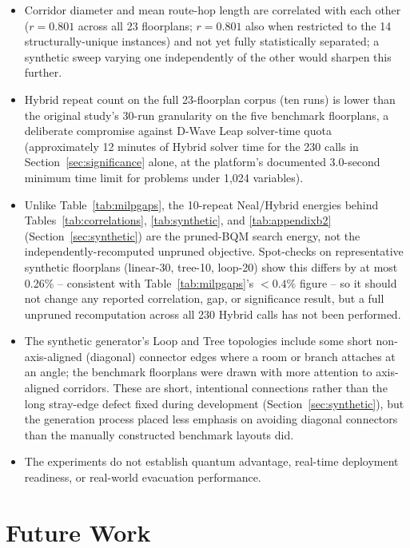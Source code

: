 \documentclass[11pt]{article}
\begin{document}
\begin{itemize}[leftmargin=*]
\item Corridor diameter and mean route-hop length are correlated with each other ($r=0.801$ across all 23 floorplans; $r=0.801$ also when restricted to the 14 structurally-unique instances) and not yet fully statistically separated; a synthetic sweep varying one independently of the other would sharpen this further.
\item Hybrid repeat count on the full 23-floorplan corpus (ten runs) is lower than the original study's 30-run granularity on the five benchmark floorplans, a deliberate compromise against D-Wave Leap solver-time quota (approximately 12 minutes of Hybrid solver time for the 230 calls in Section~\ref{sec:significance} alone, at the platform's documented 3.0-second minimum time limit for problems under 1,024 variables).
\item Unlike Table~\ref{tab:milpgaps}, the 10-repeat Neal/Hybrid energies behind Tables~\ref{tab:correlations}, \ref{tab:synthetic}, and \ref{tab:appendixb2} (Section~\ref{sec:synthetic}) are the pruned-BQM search energy, not the independently-recomputed unpruned objective. Spot-checks on representative synthetic floorplans (linear-30, tree-10, loop-20) show this differs by at most 0.26\% -- consistent with Table~\ref{tab:milpgaps}'s $<0.4\%$ figure -- so it should not change any reported correlation, gap, or significance result, but a full unpruned recomputation across all 230 Hybrid calls has not been performed.
\item The synthetic generator's Loop and Tree topologies include some short non-axis-aligned (diagonal) connector edges where a room or branch attaches at an angle; the benchmark floorplans were drawn with more attention to axis-aligned corridors. These are short, intentional connections rather than the long stray-edge defect fixed during development (Section~\ref{sec:synthetic}), but the generation process placed less emphasis on avoiding diagonal connectors than the manually constructed benchmark layouts did.
\item The experiments do not establish quantum advantage, real-time deployment readiness, or real-world evacuation performance.
\end{itemize}

\section{Future Work}
\end{document}
